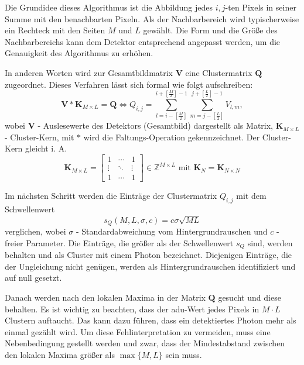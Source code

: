 \noindent
Die Grundidee dieses Algorithmus ist die Abbildung jedes $i,j$-ten Pixels in seiner Summe mit den benachbarten Pixeln. Als der Nachbarbereich wird typischerweise ein Rechteck mit den Seiten $M$ und $L$ gewählt. Die Form und die Größe des Nachbarbereichs kann dem Detektor entsprechend angepasst werden, um die Genauigkeit des Algorithmus zu erhöhen.

\noindent
In anderen Worten wird zur Gesamtbildmatrix $\mathbf{V}$ eine Clustermatrix $\mathbf{Q}$ zugeordnet. Dieses Verfahren lässt sich formal wie folgt aufschreiben:
\begin{equation}
     \mathbf{V} * \mathbf{K}_{M\times L} =  \mathbf{Q} \Leftrightarrow Q_{i, j} = \sum_{l=i-\left[\frac{M}{2}\right]}^{i+\left[\frac{M}{2}\right]-1} \sum_{m=j-\left[\frac{L}{2}\right]}^{j+\left[\frac{L}{2}\right]-1} V_{l,m},
\end{equation}
wobei $\mathbf{V}$ - Auslesewerte des Detektors (Gesamtbild) dargestellt als Matrix, $\mathbf{K}_{M \times L}$ - Cluster-Kern, mit $*$ wird die Faltungs-Operation gekennzeichnet. Der Cluster-Kern gleicht i. A.
\begin{equation}
    \mathbf{K}_{M \times L}  = \begin{bmatrix}
1 & \cdots & 1\\
\vdots & \ddots & \vdots\\
1 & \cdots & 1
\end{bmatrix}
\in \mathbb{Z}^{M \times L} \text{ mit } \mathbf{K}_N = \mathbf{K}_{N \times N}
\end{equation}

\noindent
Im nächsten Schritt werden die Einträge der Clustermatrix $Q_{i,j}$ mit dem Schwellenwert 
\begin{equation}
    s_Q(M, L, \sigma, c) = c\sigma\sqrt{ML}
\end{equation}
verglichen, wobei $\sigma$ - Standardabweichung vom Hintergrundrauschen und $c$ - freier Parameter. Die Einträge, die größer als der Schwellenwert $s_Q$ sind, werden behalten und als Cluster mit einem Photon bezeichnet. Diejenigen Einträge, die der Ungleichung nicht genügen, werden als Hintergrundrauschen identifiziert und auf null gesetzt.

\noindent
Danach werden nach den lokalen Maxima in der Matrix $\mathbf{Q}$ gesucht und diese behalten. Es ist wichtig zu beachten, dass der \gls{adu}-Wert jedes Pixels in $M\cdot L$ Clustern auftaucht. Das kann dazu führen, dass ein detektiertes Photon mehr als einmal gezählt wird. Um diese Fehlinterpretation zu vermeiden, muss eine Nebenbedingung gestellt werden und zwar, dass der Mindestabstand zwischen den lokalen Maxima größer als $\max\{M,L\}$ sein muss.

